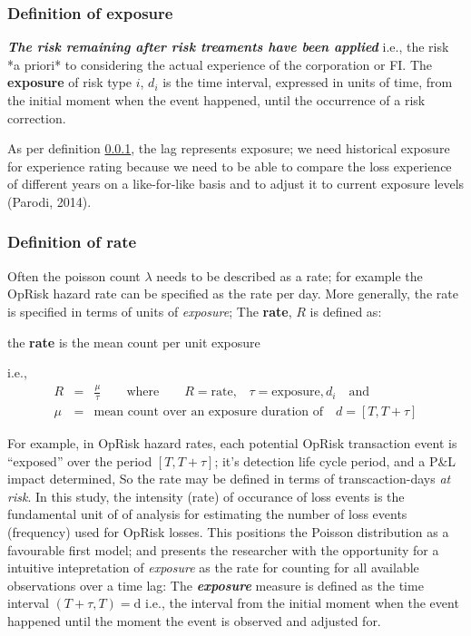 \documentclass{DissertateUSU}
\begin{document}
\subsubsection{Definition of exposure}
\label{sssec:Definition of exposure}
\begin{definition}
\emph{\textbf{The risk remaining after risk treaments have been applied}} i.e., the risk *a priori* to considering the actual experience of the corporation or FI. The  \textbf{exposure} of risk type $i$, $d_{i}$ is the time interval, expressed in units of time, from the initial moment when the event happened, until the occurrence of a risk correction.
\end{definition}

As per definition \ref{sssec:Definition of exposure}, the lag represents
exposure; we need historical exposure for experience rating because we
need to be able to compare the loss experience of different years on a
like-for-like basis and to adjust it to current exposure levels (Parodi,
2014).

\subsubsection{Definition of rate}
\label{sssec:Definition of rate}

Often the poisson count \(\lambda\) needs to be described as a rate; for
example the OpRisk hazard rate can be specified as the rate per day.
More generally, the rate is specified in terms of units of
\emph{exposure}; The \textbf{rate}, \(R\) is defined as:\medskip

\begin{definition}
the \textbf{rate} is the mean count per unit exposure
\end{definition}

i.e., \singlespacing \begin{eqnarray}
R &=& \frac{\mu}{\tau} \qquad \mbox{where} \qquad R = \mbox{rate,} \quad \tau = \mbox{exposure},d_{i}\quad \mbox{and}\nonumber\\
\mu &=& \mbox{mean count over an exposure duration of} \quad d = [T,T+\tau] \nonumber
\end{eqnarray} \doublespacing

For example, in OpRisk hazard rates, each potential OpRisk transaction
event is ``exposed'' over the period \([T,T+\tau]\); it's detection life
cycle period, and a P\&L impact determined, So the rate may be defined
in terms of transcaction-days \emph{at risk}. In this study, the
intensity (rate) of occurance of loss events is the fundamental unit of
of analysis for estimating the number of loss events (frequency) used
for OpRisk losses. This positions the Poisson distribution as a
favourable first model; and presents the researcher with the opportunity
for a intuitive intepretation of \emph{exposure} as the rate for
counting for all available observations over a time lag: The
\emph{\textbf{exposure}} measure is defined as the time interval
\((T+\tau,T) = \mbox{d}\) i.e., the interval from the initial moment
when the event happened until the moment the event is observed and
adjusted for.\medskip
\end{document}
